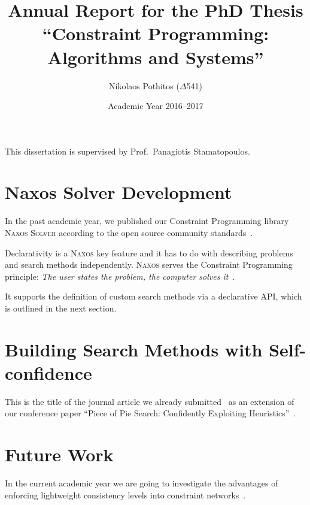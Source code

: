 \documentclass[a4paper]{article}
\begin{document}
\title{Annual Report for the PhD Thesis ``Constraint
       Programming: Algorithms and Systems''}

\author{Nikolaos Pothitos ($\Delta$541)}


\date{Academic Year 2016--2017}

\maketitle

This dissertation is supervised by Prof.~Panagiotis
Stamatopoulos.


\section{Naxos Solver Development}

In the past academic year, we published our Constraint
Programming library \textsc{Naxos Solver} according to the
open source community standards~\cite{Naxos}.

Declarativity is a \textsc{Naxos} key feature and it has to
do with describing problems and search methods
independently. \textsc{Naxos} serves the Constraint
Programming principle: \emph{The user states the problem,
the computer solves it}~\cite{Freuder2014}.

It supports the definition of custom search methods via a
declarative API, which is outlined in the next section.


\section{Building Search Methods with Self-confidence}

This is the title of the journal article we already
submitted~\cite{Pothitos2017} as an extension of our
conference paper ``Piece of Pie Search: Confidently
Exploiting Heuristics''~\cite{Pothitos2016-PoPS}.


\section{Future Work}

In the current academic year we are going to investigate the
advantages of enforcing lightweight consistency levels into
constraint networks~\cite{Bessiere2006}.



\end{document}
